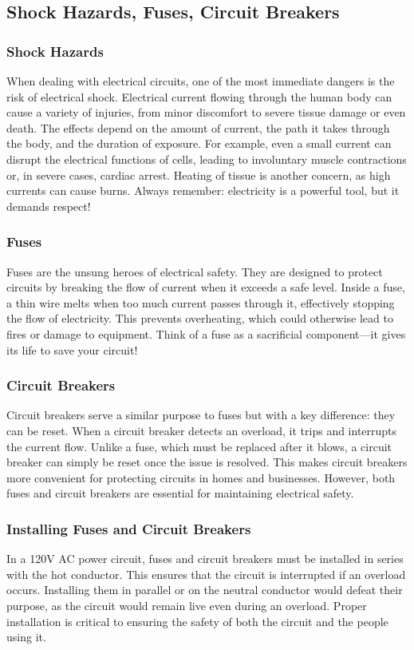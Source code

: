 \subsection{Shock Hazards, Fuses, Circuit Breakers}
\label{subsec:shock-fuses}

\subsubsection*{Shock Hazards}
When dealing with electrical circuits, one of the most immediate dangers is the risk of electrical shock. Electrical current flowing through the human body can cause a variety of injuries, from minor discomfort to severe tissue damage or even death. The effects depend on the amount of current, the path it takes through the body, and the duration of exposure. For example, even a small current can disrupt the electrical functions of cells, leading to involuntary muscle contractions or, in severe cases, cardiac arrest. Heating of tissue is another concern, as high currents can cause burns. Always remember: electricity is a powerful tool, but it demands respect!

\subsubsection*{Fuses}
Fuses are the unsung heroes of electrical safety. They are designed to protect circuits by breaking the flow of current when it exceeds a safe level. Inside a fuse, a thin wire melts when too much current passes through it, effectively stopping the flow of electricity. This prevents overheating, which could otherwise lead to fires or damage to equipment. Think of a fuse as a sacrificial component—it gives its life to save your circuit!

\subsubsection*{Circuit Breakers}
Circuit breakers serve a similar purpose to fuses but with a key difference: they can be reset. When a circuit breaker detects an overload, it trips and interrupts the current flow. Unlike a fuse, which must be replaced after it blows, a circuit breaker can simply be reset once the issue is resolved. This makes circuit breakers more convenient for protecting circuits in homes and businesses. However, both fuses and circuit breakers are essential for maintaining electrical safety.

\subsubsection*{Installing Fuses and Circuit Breakers}
In a 120V AC power circuit, fuses and circuit breakers must be installed in series with the hot conductor. This ensures that the circuit is interrupted if an overload occurs. Installing them in parallel or on the neutral conductor would defeat their purpose, as the circuit would remain live even during an overload. Proper installation is critical to ensuring the safety of both the circuit and the people using it.

